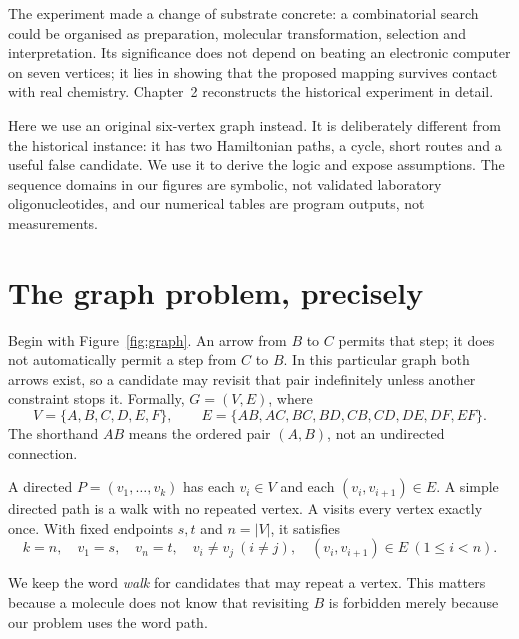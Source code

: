The experiment made a change of substrate concrete: a combinatorial search could
be organised as preparation, molecular transformation, selection and
interpretation. Its significance does not depend on beating an electronic
computer on seven vertices; it lies in showing that the proposed mapping
survives contact with real chemistry. Chapter~2 reconstructs the historical
experiment in detail.

Here we use an original six-vertex graph instead. It is deliberately different
from the historical instance: it has two Hamiltonian paths, a cycle, short
routes and a useful false candidate. We use it to derive the logic and expose
assumptions. The sequence domains in our figures are symbolic, not validated
laboratory oligonucleotides, and our numerical tables are program outputs, not
measurements.

\section{The graph problem, precisely}\label{sec:graph}
Begin with Figure~\ref{fig:graph}. An arrow from $B$ to $C$ permits that step;
it does not automatically permit a step from $C$ to $B$. In this particular graph
both arrows exist, so a candidate may revisit that pair indefinitely unless
another constraint stops it.
Formally, $G=(V,E)$, where
\[
 V=\{A,B,C,D,E,F\},\qquad
 E=\{AB,AC,BC,BD,CB,CD,DE,DF,EF\}.
\]
The shorthand $AB$ means the ordered pair $(A,B)$, not an undirected connection.

\begin{definition}
A directed  $P=(v_1,\ldots,v_k)$ has each $v_i\in V$ and each
$(v_i,v_{i+1})\in E$. A simple directed path is a walk with no repeated vertex.
A  visits every vertex exactly once. With fixed endpoints
$s,t$ and $n=|V|$, it satisfies
\[
 k=n,\quad v_1=s,\quad v_n=t,\quad
 v_i\ne v_j\ (i\ne j),\quad
 (v_i,v_{i+1})\in E\ (1\le i<n).
\]
\end{definition}

We keep the word \emph{walk} for candidates that may repeat a vertex. This
matters because a molecule does not know that revisiting $B$ is forbidden merely
because our problem uses the word path.

